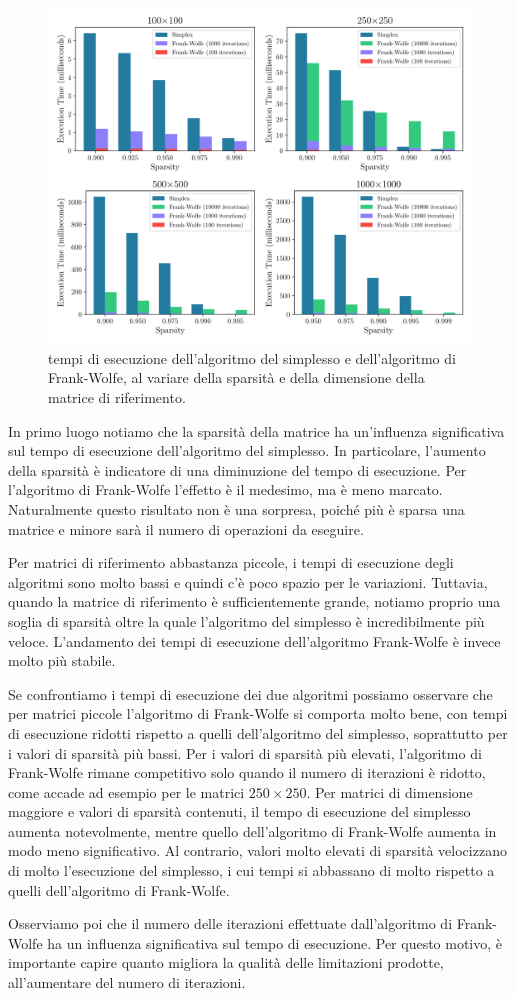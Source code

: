 \begin{figure}[!ht]
    \centering
    \includegraphics[width=\textwidth]{assets/figures/timesize.pdf}
    \caption{tempi di esecuzione dell'algoritmo del simplesso e dell'algoritmo di Frank-Wolfe, al variare della sparsità
    e della dimensione della matrice di riferimento.}
    \label{fig:timesize}
\end{figure}

In primo luogo notiamo che la sparsità della matrice ha un'influenza significativa sul tempo di esecuzione
dell'algoritmo del simplesso.  In particolare,
l'aumento della sparsità è indicatore di una diminuzione del tempo di esecuzione.
Per l'algoritmo di Frank-Wolfe l'effetto è il medesimo, ma è meno marcato.
Naturalmente
questo risultato non è una sorpresa, poiché più è sparsa una matrice e minore sarà il numero di operazioni da eseguire.

Per matrici di riferimento abbastanza piccole, i tempi di esecuzione degli algoritmi sono molto bassi e quindi
c'è poco spazio per le variazioni. Tuttavia, quando la matrice di riferimento è sufficientemente grande, notiamo proprio
una soglia di sparsità oltre la quale l'algoritmo del simplesso è incredibilmente più veloce. L'andamento dei tempi di
esecuzione dell'algoritmo Frank-Wolfe è invece molto più stabile.

Se confrontiamo i tempi di esecuzione dei due algoritmi possiamo osservare che per matrici piccole l'algoritmo di
Frank-Wolfe si comporta molto bene, con tempi di esecuzione ridotti rispetto a quelli dell'algoritmo del
simplesso, soprattutto per i valori di sparsità più bassi. Per i valori di sparsità più elevati, l'algoritmo di
Frank-Wolfe rimane competitivo solo quando il numero di iterazioni è ridotto, come accade ad esempio per le matrici \(
250\times 250 \). Per matrici di dimensione maggiore e valori di sparsità contenuti, il tempo di esecuzione del simplesso aumenta notevolmente, mentre
quello dell'algoritmo di Frank-Wolfe aumenta in modo meno significativo. Al contrario, valori molto elevati di
sparsità velocizzano di molto l'esecuzione del simplesso, i cui tempi si abbassano di molto rispetto a quelli
dell'algoritmo di Frank-Wolfe.

Osserviamo poi che il numero delle iterazioni effettuate dall'algoritmo di Frank-Wolfe ha un influenza significativa sul
tempo di esecuzione. Per questo motivo, è importante capire quanto migliora la qualità delle limitazioni prodotte,
all'aumentare del numero di iterazioni.
